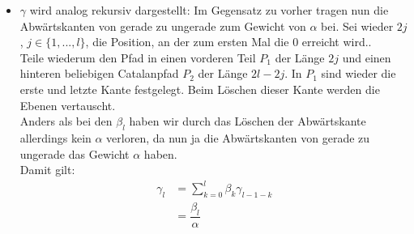 \documentclass[a4paper, 11pt]{scrreprt}
\begin{document}
\begin{itemize}
\item $ \gamma $ wird analog rekursiv dargestellt: Im Gegensatz zu vorher tragen nun die Abwärtskanten von gerade zu ungerade zum Gewicht von $ \alpha $ bei. Sei wieder \(2j\), \(j\in\{1,...,l\}\), die Position, an der zum ersten Mal die \(0\) erreicht wird.. \\
Teile wiederum den Pfad in einen vorderen Teil \(P_1\) der Länge \(2j\) und einen hinteren beliebigen Catalanpfad \(P_2\) der Länge \(2l-2j\). In \(P_1\) sind wieder die erste und letzte Kante festgelegt. Beim Löschen dieser Kante werden die Ebenen vertauscht. \\
Anders als bei den $ \beta_l $ haben wir durch das Löschen der Abwärtskante allerdings kein $ \alpha $ verloren, da nun ja die Abwärtskanten von gerade zu ungerade das Gewicht $ \alpha $ haben.\\ 
Damit gilt: 
\begin{equation}
	\begin{split}
		\gamma_l &=\sum_{k=0}^l \beta_k\gamma_{l-1-k} \\
		&= \dfrac{\beta_l}{\alpha}
	\end{split}
\end{equation}


\end{itemize}
\end{document}
